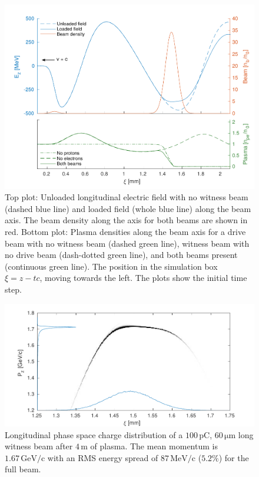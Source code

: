\documentclass[aps,prstab,reprint,amsmath,amssymb,groupedaddress]{revtex4-1}
\newcommand{\unit}[1]{\,\mathrm{#1}}
\begin{document}
\begin{figure}[hbt]
    \includegraphics[width=\linewidth,trim={2mm 0mm 2mm 0mm},clip]{figures/beamLoading}
    \caption{\label{Fig:BeamLoading} Top plot: Unloaded longitudinal electric field with no witness beam (dashed blue line) and loaded field (whole blue line) along the beam axis. The beam density along the axis for both beams are shown in red. Bottom plot: Plasma densities along the beam axis for a drive beam with no witness beam (dashed green line), witness beam with no drive beam (dash-dotted green line), and both beams present (continuous green line). The position in the simulation box $\xi = z - tc$, moving towards the left. The plots show the initial time step.}
\end{figure}

\begin{figure}[hbt]
    \includegraphics[width=\linewidth,trim={2mm 0mm 2mm 0mm},clip]{figures/beamPhaseSpace}
    \caption{\label{Fig:BeamPS} Longitudinal phase space charge distribution of a $100\unit{pC}$, $60\unit{\mu m}$ long witness beam after $4\unit{m}$ of plasma. The mean momentum is $1.67\unit{GeV/c}$ with an RMS energy spread of $87\unit{MeV/c}$ ($5.2\%$) for the full beam.}
\end{figure}
\end{document}
